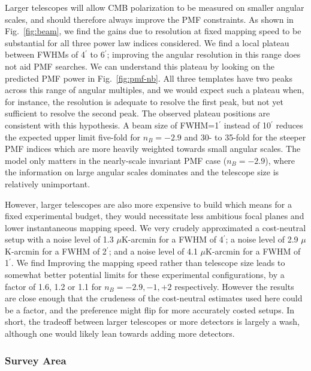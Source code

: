 \documentclass[apj]{emulateapj}
\newcommand{\ukarcmin}{\ensuremath{\mu}K-arcmin}
\begin{document}
Larger telescopes will allow CMB polarization to be measured on smaller angular scales, and should therefore always improve the PMF constraints. 
As shown in Fig.~\ref{fig:beam}, we find the gains due to resolution at fixed mapping speed to be substantial for all three power law indices considered. 
We find a local plateau between FWHMs of 4$^\prime$ to 6$^\prime$; improving the angular resolution in this range does not aid PMF searches. 
We can understand this plateau by looking on the predicted PMF power in Fig.~\ref{fig:pmf-nb}. 
All three templates have two peaks across this range of angular multiples, and we would expect such a plateau when, for instance, the resolution is adequate to resolve the first peak, but not yet sufficient to resolve the second peak. 
The observed plateau positions are consistent with this hypothesis. 
 A beam size of FWHM=1$^\prime$ instead of 10$^\prime$ reduces the expected upper limit five-fold for $n_B=-2.9$ and 30- to 35-fold for the steeper PMF indices which are more heavily weighted towards small angular scales. 
   The model only matters in the nearly-scale invariant PMF case ($n_B=-2.9$), where the information on large angular scales dominates and the telescope size is relatively unimportant. 


However, larger telescopes are also more expensive to build which means for a fixed experimental budget, they would necessitate less ambitious focal planes and lower instantaneous mapping speed. 
We very crudely approximated a cost-neutral setup with a noise level of 1.3 \ukarcmin{} for a FWHM of 4$^\prime$; a noise level of 2.9 \ukarcmin{} for a FWHM of 2$^\prime$; and a noise level of 4.1 \ukarcmin{} for a FWHM of 1$^\prime$. 
We find 
Improving the mapping speed rather than telescope size leads to somewhat better potential limits for these experimental configurations, by a factor of 1.6, 1.2 or 1.1 for $n_B = -2.9, -1, +2$ respectively. 
However the results are close enough that the crudeness of the cost-neutral estimates used here could be a factor, and the preference might flip for more accurately costed setups. 
In short,  the tradeoff between larger telescopes or more detectors is largely a wash, although one would likely lean towards adding more detectors. 

\subsubsection{Survey Area}
\end{document}
